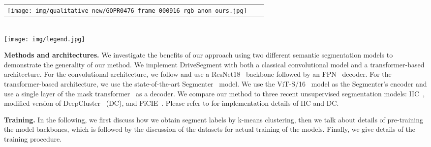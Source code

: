 \documentclass[runningheads]{llncs}
\newcommand{\ours}{DriveSegment\xspace}
\newcommand{\supp}{appendix\xspace}
\newcommand{\paragraphcustom}[1]{\smallskip\noindent\textbf{#1}}
\begin{document}
\begin{figure*}[t]
\begin{minipage}[t]{0.98\columnwidth}
\begin{tabular}{c@{}c@{}c}
         \texttt{[image: img/qualitative\_new/GOPR0476\_frame\_000916\_rgb\_anon\_ours.jpg]} \\
         \end{tabular}
    \end{minipage}\\
    \texttt{[image: img/legend.jpg]}
    \vspace{-6pt}
    \caption{
        \textbf{Qualitative results} for \emph{unsupervised} semantic segmentation using our \ours approach. To obtain the best matching between our pseudo-classes and the set of ground-truth classes, we use the Hungarian algorithm. The first two rows show samples from the Cityscapes~\cite{Cordts2016Cityscapes} dataset, and the other three rows show samples from the night and fog splits of the ACDC~\cite{SDV21} dataset. Please see Figures~\ref{fig:qualitative_supp},~\ref{fig:qualitative_supp2} and~\ref{fig:qualitative_acdc} in the 
        \supp
        for more qualitative results.
    }
    \label{fig:qualitative}
    \vspace{-4ex}
\end{figure*}

\paragraphcustom{Methods and architectures.}
\label{sec:architecture}
We investigate the benefits of our approach using two different semantic segmentation models to demonstrate the generality of our method. We implement \ours with both a classical convolutional model and a transformer-based architecture. For the convolutional architecture, we follow \cite{cho2021picie} and use a ResNet18~\cite{he2016deep} backbone followed by an FPN~\cite{lin2017feature} decoder. For the transformer-based architecture, we use the state-of-the-art Segmenter~\cite{Strudel_2021_ICCV} model.
We use the ViT-S/16~\cite{dosovitskiy2021image} model as the Segmenter's encoder and use a single layer of the mask transformer~\cite{Strudel_2021_ICCV} as a decoder.
We compare our method to three recent unsupervised segmentation models: IIC~\cite{ji2019invariant}, modified version of DeepCluster~\cite{caron2018deep} (DC), and PiCIE~\cite{cho2021picie}.
Please refer to \cite{cho2021picie} for implementation details of IIC and DC.

\paragraphcustom{Training.}
\label{sec:training_details}
In the following, we first discuss how we obtain segment labels by k-means clustering, then we talk about details of pre-training the model backbones, which is followed by the discussion of the datasets for actual training of the models. Finally, we give details of the training procedure.
\end{document}
